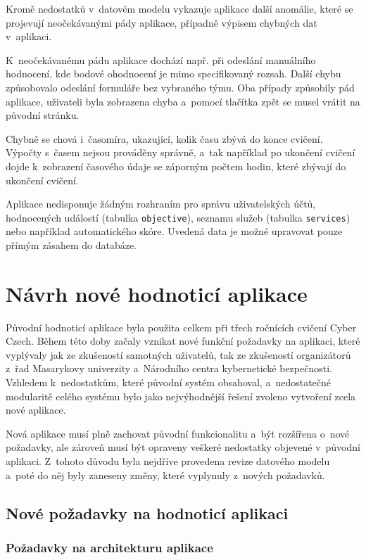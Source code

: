 \documentclass[
  digital,
  twoside,
  table, 
  nolof, 
  nolot
]{fithesis3}
\begin{document}
Kromě nedostatků v~datovém modelu vykazuje aplikace další anomálie, které se projevují neočekávanými pády aplikace, případně výpisem chybných dat v~aplikaci.

K~neočekávanému pádu aplikace dochází např. při odeslání manuálního hodnocení, kde bodové ohodnocení je mimo specifikovaný rozsah. Další chybu způsobovalo odeslání formuláře bez vybraného týmu. Oba případy způsobily pád aplikace, uživateli byla zobrazena chyba a~pomocí tlačítka zpět se musel vrátit na původní stránku.

Chybně se chová i~časomíra, ukazující, kolik času zbývá do konce cvičení. Výpočty s~časem nejsou prováděny správně, a~tak například po ukončení cvičení dojde k~zobrazení časového údaje se záporným počtem hodin, které zbývají do ukončení cvičení.

Aplikace nedisponuje žádným rozhraním pro správu uživatelských účtů, hodnocených událostí (tabulka \texttt{objective}), seznamu služeb (tabulka \texttt{services}) nebo například automatického skóre. Uvedená data je možné upravovat pouze přímým zásahem do databáze.

\chapter{Návrh nové hodnoticí aplikace}
\label{newApp}
Původní hodnoticí aplikace byla použita celkem při třech ročnících cvičení Cyber Czech. Během této doby začaly vznikat nové funkční požadavky na aplikaci, které vyplývaly jak ze zkušeností samotných uživatelů, tak ze zkušeností organizátorů z~řad Masarykovy univerzity a~Národního centra kybernetické bezpečnosti. Vzhledem k~nedostatkům, které původní systém obsahoval, a~nedostatečné modularitě celého systému bylo jako nejvýhodnější řešení zvoleno vytvoření zcela nové aplikace. 

Nová aplikace musí plně zachovat původní funkcionalitu a~být rozšířena o~nové požadavky, ale zároveň musí být opraveny veškeré nedostatky objevené v~původní aplikaci. Z~tohoto důvodu byla nejdříve provedena revize datového modelu a~poté do něj byly zaneseny změny, které vyplynuly z~nových požadavků. 

\section{Nové požadavky na hodnoticí aplikaci}
\subsection{Požadavky na architekturu aplikace}
\end{document}

